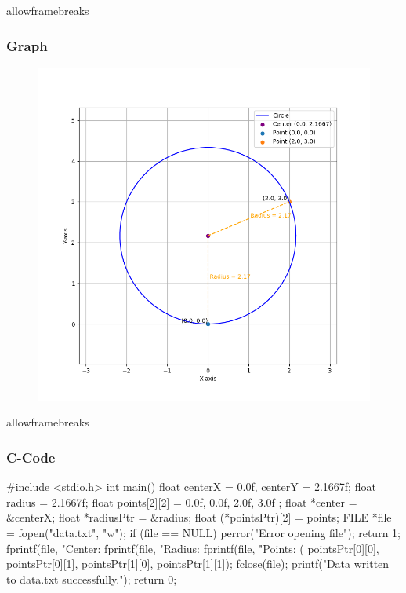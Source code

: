 \documentclass{beamer}
\begin{document}
\begin{frame}{allowframebreaks}
\frametitle{Graph}
\begin{figure}[ht]
\centering
\includegraphics[width=0.7\linewidth]{figs/Fig1.png}
\end{figure}
\end{frame}


\begin{frame}{allowframebreaks}
\frametitle{C-Code}
#include <stdio.h>
int main() {
    float centerX = 0.0f, centerY = 2.1667f; 
    float radius = 2.1667f;                    
    float points[2][2] = { {0.0f, 0.0f}, {2.0f, 3.0f} }; 
    float *center = &centerX;
    float *radiusPtr = &radius;
    float (*pointsPtr)[2] = points; 
    FILE *file = fopen("data.txt", "w");
    if (file == NULL) {
        perror("Error opening file");
        return 1;}
    fprintf(file, "Center: %
    fprintf(file, "Radius: %
    fprintf(file, "Points: (%
            pointsPtr[0][0], pointsPtr[0][1], pointsPtr[1][0], pointsPtr[1][1]);
    fclose(file);
    printf("Data written to data.txt successfully.\n");
    return 0;
}

\end{frame}
\end{document}
